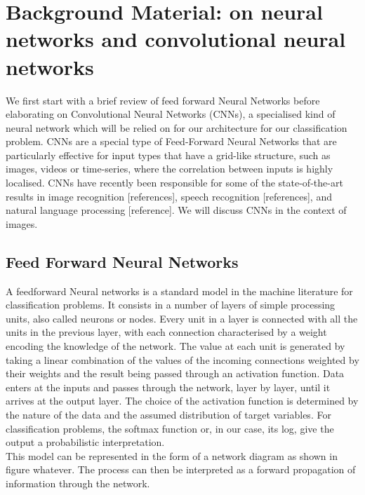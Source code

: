 \chapter{Background Material: on neural networks and convolutional neural networks}

\noindent We first start with a brief review of feed forward Neural Networks before elaborating on Convolutional Neural Networks (CNNs), a specialised kind of neural network which will be relied on for our architecture for our classification problem. CNNs are a special type of Feed-Forward Neural Networks that are particularly effective for input types that have a grid-like structure, such as images, videos or time-series, where the correlation between inputs is highly localised. CNNs have recently been responsible for some of the state-of-the-art results in image recognition [references], speech recognition [references], and natural language processing [reference]. We will discuss CNNs in the context of images.

\section{Feed Forward Neural Networks}

A feedforward Neural networks is a standard model in the machine literature for classification problems. It consists in a number of layers of simple processing units, also called neurons or nodes. Every unit in a layer is connected with all the units in the previous layer, with each connection characterised by a weight encoding the knowledge of the network. The value at each unit is generated by taking a linear combination of the values of the incoming connections weighted by their weights and the result being passed through an activation function. Data enters at the inputs and passes through the network, layer by layer, until it arrives at the output layer. The choice of the activation function is determined by the nature of the data and the assumed distribution of target variables. For classification problems, the softmax function or, in our case, its log, give the output a probabilistic interpretation.\\

\noindent This model can be represented in the form of a network diagram as shown in figure whatever. The process can then be interpreted as a forward propagation of information through the network.\\

